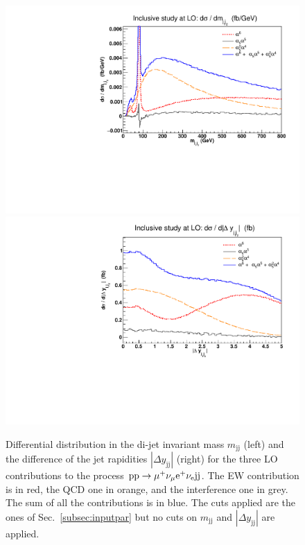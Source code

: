 \documentclass[twocolumn,epjc3]{svjour3} %
\newcommand{\Pj}{\ensuremath{\text{j}}\xspace}
\begin{document}
    \begin{figure}[hbt]
    \centering
    \includegraphics[scale=0.395]{figures/scanfigures/mjj_full.pdf}
    \includegraphics[scale=0.395]{figures/scanfigures/dyjj_full.pdf}
    \caption{Differential distribution in the di-jet invariant mass $m_{\Pj\Pj}$ (left) and the difference of the jet rapidities $|\Delta y_{\Pj\Pj}|$ (right) for the three LO contributions to the process ${\rm p}{\rm p}\to\mu^+\nu_\mu{\rm e}^+\nu_{\rm e}{\rm j}{\rm j}$.
    The EW contribution is in red, the QCD one in orange, and the interference one in grey.
    The sum of all the contributions is in blue.
    The cuts applied are the ones of Sec.~\protect\ref{subsec:inputpar} but no cuts on $m_{\Pj\Pj}$ and $|\Delta y_{\Pj\Pj}|$ are applied.}
    \label{fig:mjjdyjj_1d}
    \end{figure}
\end{document}

